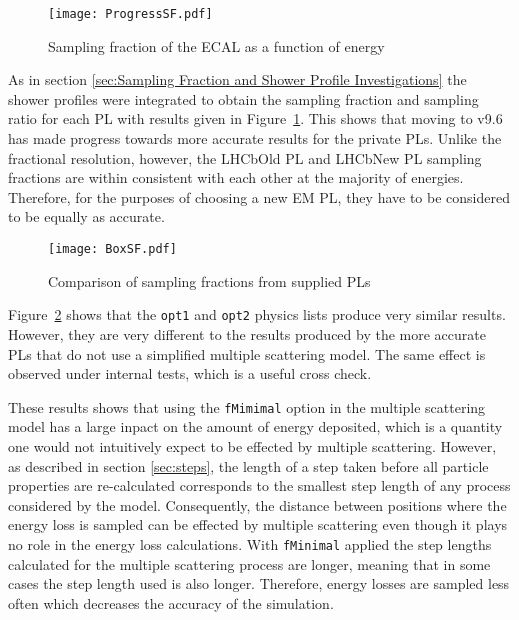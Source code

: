 \begin{figure}[h]
  \centering
  \texttt{[image: ProgressSF.pdf]}
  \caption{Sampling fraction of the ECAL as a function of energy}
  \label{fig:ProgressSF}
\end{figure}
As in section \ref{sec:Sampling Fraction and Shower Profile Investigations} the shower profiles were integrated to obtain the sampling fraction and sampling ratio for each PL with results given in Figure~\ref{fig:ProgressSF}. This shows that moving to \geant v9.6 has made progress towards more accurate results for the \lhcb private PLs.  Unlike the fractional resolution, however, the LHCbOld PL and LHCbNew PL sampling fractions are within consistent with each other at the majority of energies.  Therefore, for the purposes of choosing a new EM PL, they have to be considered to be equally as accurate.

\begin{figure}[h]
  \centering
  \texttt{[image: BoxSF.pdf]}
  \caption{Comparison of sampling fractions from \geant supplied PLs}
  \label{fig:BoxSF}
\end{figure}
Figure~\ref{fig:BoxSF} shows that the \texttt{opt1} and \texttt{opt2} physics lists produce very similar results.  However, they are very different to the results produced by the more accurate PLs that do not use a simplified multiple scattering model.  The same effect is observed under \geant internal tests, which is a useful cross check\cite{1742-6596-219-3-032045}.

These results shows that using the \texttt{fMimimal} option in the multiple scattering model has a large inpact on the amount of energy deposited, which is a quantity one would not intuitively expect to be effected by multiple scattering.  However, as described in section \ref{sec:steps}, the length of a step taken before all particle properties are re-calculated corresponds to the smallest step length of any process considered by the model.  Consequently, the distance between positions where the energy loss is sampled can be effected by multiple scattering even though it plays no role in the energy loss calculations.  With \texttt{fMinimal} applied the step lengths calculated for the multiple scattering process are longer, meaning that in some cases the step length used is also longer.  Therefore, energy losses are sampled less often which decreases the accuracy of the simulation.

